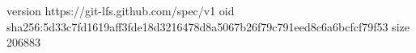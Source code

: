 version https://git-lfs.github.com/spec/v1
oid sha256:5d33c7fd1619aff3fde18d3216478d8a5067b26f79c791eed8c6a6bcfcf79f53
size 206883
